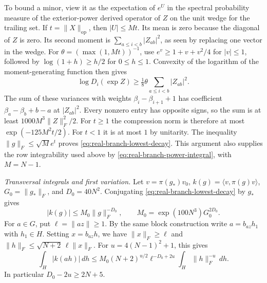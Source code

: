 To bound a minor, view it as the expectation of \(e^U\) in the
spectral probability measure of the exterior-power derived operator
of \(Z\) on the unit wedge for the trailing set. If
\(t=\|X\|_{\mathrm{op}}\), then \(|U|\le Mt\). Its mean is zero
because the diagonal of \(Z\) is zero. Its second moment is
\(\sum_{a\le i<b}|Z_{ab}|^2\), as seen by replacing one vector in
the wedge. For \(\theta=(\max(1,Mt))^{-1}\), use
\(e^v\ge 1+v+v^2/4\) for \(|v|\le 1\), followed by
\(\log(1+h)\ge h/2\) for \(0\le h\le 1\). Convexity of the
logarithm of the moment-generating function then gives
\[
 \log D_i(\exp Z)\ge \tfrac18\theta\sum_{a\le i<b}|Z_{ab}|^2.
\]
The sum of these variances with weights \(\beta_i-\beta_{i+1}+1\)
has coefficient \(\beta_a-\beta_b+b-a\) at \(|Z_{ab}|^2\).
Every nonzero entry has opposite signs, so the sum is at least
\(1000M^3\|Z\|_F^2/2\). For \(t\ge 1\) the compression norm is
therefore at most \(\exp(-125M^2t/2)\). For \(t<1\) it is at
most \(1\) by unitarity. The inequality
\(\|g\|_F\le\sqrt M e^t\) proves \eqref{eq:real-branch-lowest-decay}.
This argument also supplies the row integrability used above by
\eqref{eq:real-branch-power-integral}, with \(M=N-1\).

\emph{Transversal integrals and first variation.}
Let \(v=\pi(g_*)v_0\), \(k(g)=\langle v,\pi(g)v\rangle\),
\(G_0=\|g_*\|_F\), and \(D_0=40N^2\). Conjugating
\eqref{eq:real-branch-lowest-decay} by \(g_*\) gives
\[
 |k(g)|\le M_0\|g\|_F^{-D_0},\qquad
 M_0=\exp(100N^3)G_0^{2D_0} .
\]
For \(a\in G\), put \(\ell=\|a z\|\ge 1\). By the same block
construction write \(a=b_{az}h_1\) with \(h_1\in H\). Setting
\(x=b_{az} h\), we have \(\|x\|_F\ge\ell\) and
\(\|h\|_F\le \sqrt{N+2}\,\ell\|x\|_F\). For
\(u=4(N-1)^2+1\), this gives
\[
 \int_H |k(a h)|\,dh
 \le M_0(N+2)^{u/2}\ell^{-D_0+2u}
       \int_H\|h\|_F^{-u}\,dh.
\]
In particular \(D_0-2u\ge 2N+5\).

